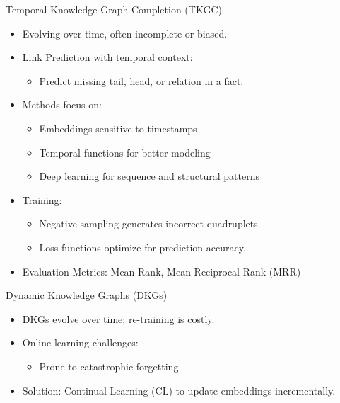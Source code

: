 \documentclass{beamer}
\begin{document}
    \begin{frame}{Temporal Knowledge Graph Completion (TKGC)}
        \begin{itemize}
            \item Evolving over time, often incomplete or biased.
            \item Link Prediction with temporal context:
            \begin{itemize}
                \item Predict missing tail, head, or relation in a fact.
            \end{itemize}
            \item Methods focus on:
            \begin{itemize}
                \item Embeddings sensitive to timestamps
                \item Temporal functions for better modeling
                \item Deep learning for sequence and structural patterns
            \end{itemize}
            \item Training:
            \begin{itemize}
                \item Negative sampling generates incorrect quadruplets.
                \item Loss functions optimize for prediction accuracy.
            \end{itemize}
            \item Evaluation Metrics: Mean Rank, Mean Reciprocal Rank (MRR)
        \end{itemize}
    \end{frame}

    \begin{frame}{Dynamic Knowledge Graphs (DKGs)}
        \begin{itemize}
            \item DKGs evolve over time; re-training is costly.
            \item Online learning challenges:
            \begin{itemize}
                \item Prone to catastrophic forgetting
            \end{itemize}
            \item Solution: Continual Learning (CL) to update embeddings incrementally.
        \end{itemize}
    \end{frame}
\end{document}
